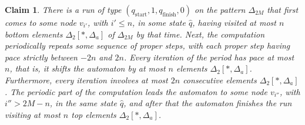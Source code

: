 \documentclass[12pt,a4paper]{article}
\newtheorem{claim}{Claim}
\theoremstyle{definition}
\begin{document}
\begin{claim}\label{claim_run_Delta_2M_from_v_to_v}
There is a run of type $(q_{\text{start}},1,q_{\text{finish}},0)$
on the pattern $\Delta_{2M}$
that first comes to some node $v_{i'}$, with $i' \leqslant n$,
in some state $\widehat{q}$,
having visited at most $n$ bottom elements $\Delta_2[*,\Delta_a]$ of $\Delta_{2M}$ by that time.
Next, the computation periodically repeats some sequence of proper steps,
with each proper step having pace strictly between $-2n$ and $2n$.
Every iteration of the period has pace at most $n$,
that is, it shifts the automaton by at most $n$ elements $\Delta_2[*,\Delta_a]$.
Furthermore, every iteration involves at most $2n$ consecutive elements $\Delta_2[*,\Delta_a]$.
The periodic part of the computation
leads the automaton to some node $v_{i''}$, with $i'' > 2M-n$,
in the same state $\widehat{q}$,
and after that the automaton finishes the run
visiting at most $n$ top elements $\Delta_2[*,\Delta_a]$.
\end{claim}
\end{document}
